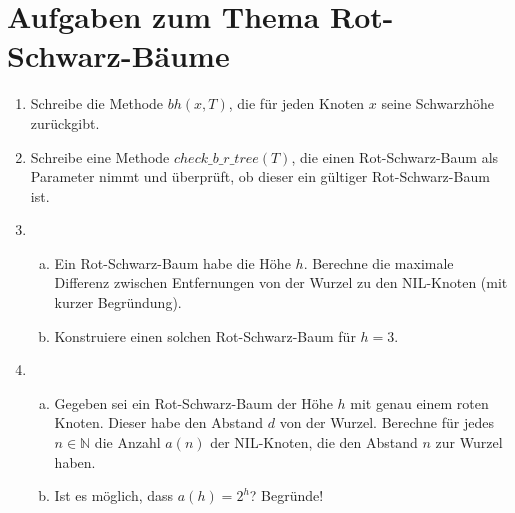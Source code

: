 \documentclass{scrartcl}
\newcommand{\rbt}{Rot-Schwarz-Baum }
\begin{document}
\section*{Aufgaben zum Thema Rot-Schwarz-Bäume}
\begin{enumerate}[(1)]

\item Schreibe die Methode $bh(x,T)$, die f\"ur jeden Knoten $x$ seine Schwarzh\"ohe zur\"uckgibt.

\item Schreibe eine Methode $check\_b\_r\_tree(T)$, die einen \rbt als Parameter nimmt und \"uberpr\"uft, ob dieser ein g\"ultiger \rbt ist.

\item \begin{enumerate}[(a)]
\item Ein \rbt habe die H\"ohe $h$. Berechne die maximale Differenz zwischen Entfernungen von der Wurzel zu den NIL-Knoten (mit kurzer Begr\"undung).
\item Konstruiere einen solchen \rbt f\"ur $h=3$.
\end{enumerate}

\item \begin{enumerate}[(a)]
\item Gegeben sei ein \rbt der H\"ohe $h$ mit genau einem roten Knoten. Dieser habe den Abstand $d$ von der Wurzel.
Berechne f\"ur jedes $n\in \mathbb{N}$ die Anzahl $a(n)$ der NIL-Knoten, die den Abstand $n$ zur Wurzel haben.
\item Ist es m\"oglich, dass $a(h)=2^h$? Begr\"unde!
\end{enumerate}

\end{enumerate}
\end{document}
